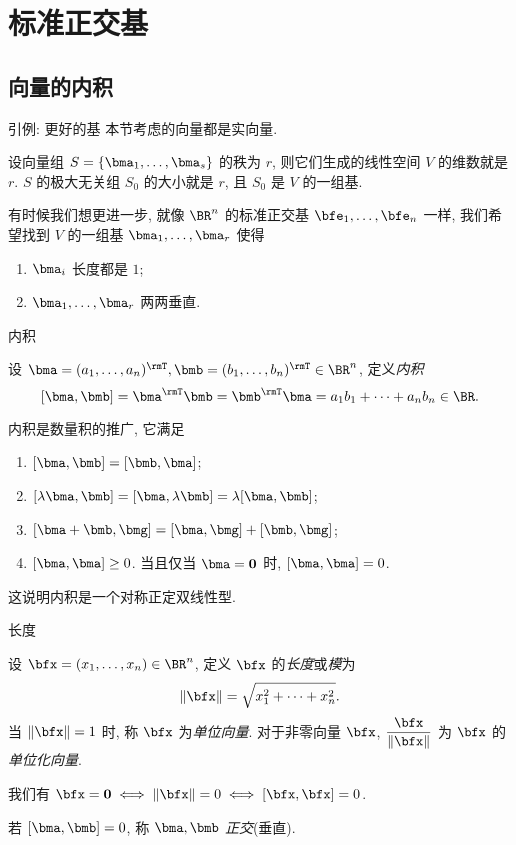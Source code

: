 \section{标准正交基}

\subsection{向量的内积}

\begin{frame}{引例: 更好的基}
	\onslide<+->
	本节考虑的向量都是实向量.

	\onslide<+->
	设向量组 $S=\{\bma_1,\dots,\bma_s\}$ 的秩为 $r$, 则它们生成的线性空间 $V$ 的维数就是 $r$.
	\onslide<+->
	$S$ 的极大无关组 $S_0$ 的大小就是 $r$, 且 $S_0$ 是 $V$ 的一组基.

	\onslide<+->
	有时候我们想更进一步, 就像 $\BR^n$ 的标准正交基 $\bfe_1,\dots,\bfe_n$ 一样, 我们希望找到 $V$ 的一组基 $\bma_1,\dots,\bma_r$ 使得
	\begin{enumerate}
		\item $\bma_i$ \alert{长度}都是 $1$;
		\item $\bma_1,\dots,\bma_r$ 两两\alert{垂直}.
	\end{enumerate}
\end{frame}


\begin{frame}{内积}
	\onslide<+->
	\begin{definition}
		设 $\bma=(a_1,\dots,a_n)^\rmT,\bmb=(b_1,\dots,b_n)^\rmT\in\BR^n$, 定义\emph{内积}
		\[[\bma,\bmb]=\bma^\rmT\bmb=\bmb^\rmT\bma=a_1b_1+\cdots+a_nb_n\in\BR.\]
	\end{definition}
	\onslide<+->
	内积是数量积的推广, 它满足
	\begin{enumerate}
		\item $[\bma,\bmb]=[\bmb,\bma]$;
		\item $[\lambda\bma,\bmb]=[\bma,\lambda\bmb]=\lambda[\bma,\bmb]$;
		\item $[\bma+\bmb,\bmg]=[\bma,\bmg]+[\bmb,\bmg]$;
		\item $[\bma,\bma]\ge 0$. 当且仅当 $\bma={\bf0}$ 时, $[\bma,\bma]=0$.
	\end{enumerate}
	\onslide<+->
	这说明内积是一个对称正定双线性型.
\end{frame}


\begin{frame}{长度}
	\onslide<+->
	\begin{definition}
		设 $\bfx=(x_1,\dots,x_n)\in\BR^n$, 定义 $\bfx$ 的\emph{长度}或\emph{模}为
		\[\|\bfx\|=\sqrt{x_1^2+\cdots+x_n^2}.\]
		当 $\|\bfx\|=1$ 时, 称 $\bfx$ 为\emph{单位向量}.
		对于非零向量 $\bfx$, \alert{$\dfrac{\bfx}{\|\bfx\|}$} 为 $\bfx$ 的\emph{单位化向量}.
	\end{definition}
	\onslide<+->
	我们有 $\bfx={\bf0}\iff\|\bfx\|=0\iff[\bfx,\bfx]=0$.
	\onslide<+->
	\begin{definition}
		若 $[\bma,\bmb]=0$, 称 $\bma,\bmb$ \emph{正交}(垂直).
	\end{definition}
\end{frame}


